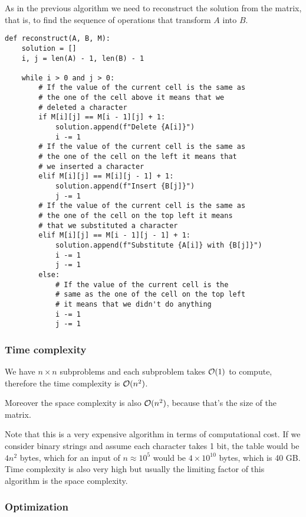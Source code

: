 \documentclass[12pt]{extarticle}
\begin{document}
As in the previous algorithm we need to reconstruct the solution from the matrix, that is, to find the sequence of operations that transform $A$ into $B$.

\begin{verbatim}
def reconstruct(A, B, M):
    solution = []
    i, j = len(A) - 1, len(B) - 1

    while i > 0 and j > 0:
        # If the value of the current cell is the same as 
        # the one of the cell above it means that we 
        # deleted a character
        if M[i][j] == M[i - 1][j] + 1:
            solution.append(f"Delete {A[i]}")
            i -= 1
        # If the value of the current cell is the same as 
        # the one of the cell on the left it means that
        # we inserted a character
        elif M[i][j] == M[i][j - 1] + 1:
            solution.append(f"Insert {B[j]}")
            j -= 1
        # If the value of the current cell is the same as
        # the one of the cell on the top left it means 
        # that we substituted a character
        elif M[i][j] == M[i - 1][j - 1] + 1:
            solution.append(f"Substitute {A[i]} with {B[j]}")
            i -= 1
            j -= 1
        else:
            # If the value of the current cell is the 
            # same as the one of the cell on the top left
            # it means that we didn't do anything
            i -= 1
            j -= 1
\end{verbatim}

\subsubsection{Time complexity}

We have $n \times n$ subproblems and each subproblem takes $\mathcal{O}(1)$ to compute, therefore the time complexity is $\mathcal{O}(n^2)$.

Moreover the space complexity is also $\mathcal{O}(n^2)$, because that's the size of the matrix.

Note that this is a very expensive algorithm in terms of computational cost. If we consider binary strings and assume each character takes 1 bit, the table would be $4 n^2 $ bytes, which for an input of $n \approx 10^5$ would be $4 \times 10^{10}$ bytes, which is 40 GB.
Time complexity is also very high but usually the limiting factor of this algorithm is the space complexity.

\subsubsection{Optimization}
\end{document}
